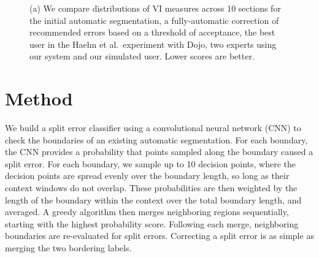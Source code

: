 \begin{figure}[t]
 \centering
    \hfill

\caption{(a) We compare distributions of VI measures across 10 sections for the initial automatic segmentation, a fully-automatic correction of recommended errors based on a threshold of acceptance, the best user in the Haehn et al.~experiment with Dojo, two experts using our system and our simulated user. Lower scores are better.}
\label{fig:results}

\end{figure}


\section{Method}
We build a split error classifier using a convolutional neural network (CNN) to check the boundaries of an existing automatic segmentation. For each boundary, the CNN provides a probability that points sampled along the boundary caused a split error. For each boundary, we sample up to 10 decision points, where the decision points are spread evenly over the boundary length, so long as their context windows do not overlap. These probabilities are then weighted by the length of the boundary within the context over the total boundary length, and averaged. A greedy algorithm then merges neighboring regions sequentially, starting with the highest probability score. Following each merge, neighboring boundaries are re-evaluated for split errors. Correcting a split error is as simple as merging the two bordering labels.

